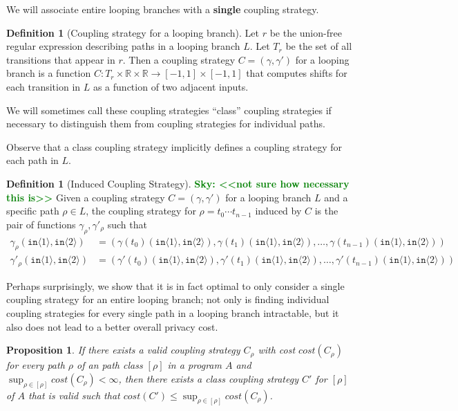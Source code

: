 \documentclass[12pt]{article}
\newcommand{\RR}{\mathbb{R}}
\newcommand{\brangle}[1]{\langle#1 \rangle}
\newcommand{\todo}[2]{\textcolor{#1}{\textbf{#2}}}
\newcommand{\sky}[1]{\todo{green}{Sky: <<#1>>}}
\newtheorem{prop}[thm]{Proposition}
\theoremstyle{definition}
\newtheorem{defn}[thm]{Definition}
\begin{document}
We will associate entire looping branches with a \textbf{single} coupling strategy.

\begin{defn}[Coupling strategy for a looping branch]
    Let $r$ be the union-free regular expression describing paths in a looping branch $L$. Let $T_r$ be the set of all transitions that appear in $r$. Then a coupling strategy $C = (\gamma, \gamma')$ for a looping branch is a function $C:T_r\times\RR \times\RR\to [-1, 1]\times[-1, 1]$ that computes shifts for each transition in $L$ as a function of two adjacent inputs.
    
\end{defn}


We will sometimes call these coupling strategies ``class'' coupling strategies if necessary to distinguish them from coupling strategies for individual paths.

Observe that a class coupling strategy implicitly defines a coupling strategy for each path in $L$.

\begin{defn}[Induced Coupling Strategy]
    \sky{not sure how necessary this is}
    Given a coupling strategy $C = (\gamma, \gamma')$ for a looping branch $L$ and a specific path $\rho\in L$, the coupling strategy for $\rho=t_0\cdots t_{n-1}$ induced by $C$ is the pair of functions $\gamma_\rho, \gamma'_\rho$ such that 
    \begin{align*}
        \gamma_\rho(\texttt{in}\brangle{1}, \texttt{in}\brangle{2}) &= (\gamma(t_0)(\texttt{in}\brangle{1}, \texttt{in}\brangle{2}), \gamma(t_1)(\texttt{in}\brangle{1}, \texttt{in}\brangle{2}), \ldots,\gamma(t_{n-1})(\texttt{in}\brangle{1}, \texttt{in}\brangle{2}) )\\
        \gamma'_\rho(\texttt{in}\brangle{1}, \texttt{in}\brangle{2}) &= (\gamma'(t_0)(\texttt{in}\brangle{1}, \texttt{in}\brangle{2}), \gamma'(t_1)(\texttt{in}\brangle{1}, \texttt{in}\brangle{2}), \ldots,\gamma'(t_{n-1})(\texttt{in}\brangle{1}, \texttt{in}\brangle{2}) )
    \end{align*}
\end{defn}

Perhaps surprisingly, we show that it is in fact optimal to only consider a single coupling strategy for an entire looping branch; not only is finding individual coupling strategies for every single path in a looping branch intractable, but it also does not lead to a better overall privacy cost. 

\begin{prop}\label{ClassCouplingStrategiesAreEnoughProp}
    If there exists a valid coupling strategy $C_\rho$ with cost $cost(C_\rho)$ for every path $\rho$ of an path class $[\rho]$ in a program $A$ and $\sup_{\rho\in [\rho]}cost(C_\rho)< \infty$, then there exists a class coupling strategy $C'$ for $[\rho]$ of $A$ that is valid such that $cost(C') \leq \sup_{\rho\in [\rho]}cost(C_\rho)$. 
\end{prop}
\end{document}
